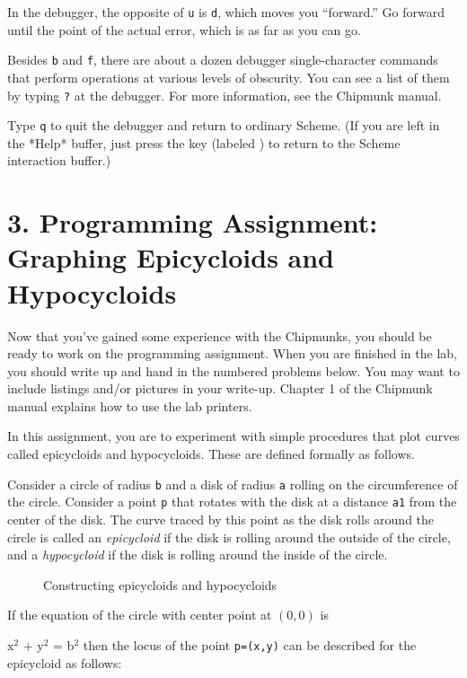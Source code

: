 In the debugger, the opposite of {\tt u} is {\tt d}, which moves you
``forward.'' Go forward until the point of the actual error,
which is as far as you can go.

Besides {\tt b} and {\tt f}, there are about a dozen debugger single-character
commands that perform operations at various levels of obscurity.  You can see a
list of them by typing {\tt ?} at the debugger.  For more information, see the
Chipmunk manual.

Type {\tt q} to quit the debugger and return to ordinary Scheme.  (If you are
left in the *Help* buffer, just press the  key (labeled )
to return to the Scheme interaction buffer.)

\section{3. Programming Assignment: \\ Graphing Epicycloids and Hypocycloids}

Now that you've gained some experience with the Chipmunks, you should be ready
to work on the programming assignment.  When you are finished in the lab, you
should write up and hand in the numbered problems below.  You may want to
include listings and/or pictures in your write-up.  Chapter 1 of the Chipmunk
manual explains how to use the lab printers.

In this assignment, you are to experiment with simple procedures that plot
curves called epicycloids and hypocycloids.  These are defined formally as
follows.

Consider a circle of radius {\tt b} and a disk of radius {\tt a} rolling on the
circumference of the circle.  Consider a point {\tt p} that rotates with the
disk at a distance {\tt a1} from the center of the disk.  The curve traced by
this point as the disk rolls around the circle is called an {\it epicycloid} if
the disk is rolling around the outside of the circle, and a {\it hypocycloid}
if the disk is rolling around the inside of the circle.

\begin{figure}
\vspace{4 in}
\caption{Constructing epicycloids and hypocycloids}
\end{figure}

If the equation of the circle with center point at $(0, 0)$ is

\beginlisp
x$^2$ + y$^2$ = b$^2$
\endlisp
then the locus of the point {\tt p=(x,y)} can be described for the
epicycloid as follows:

